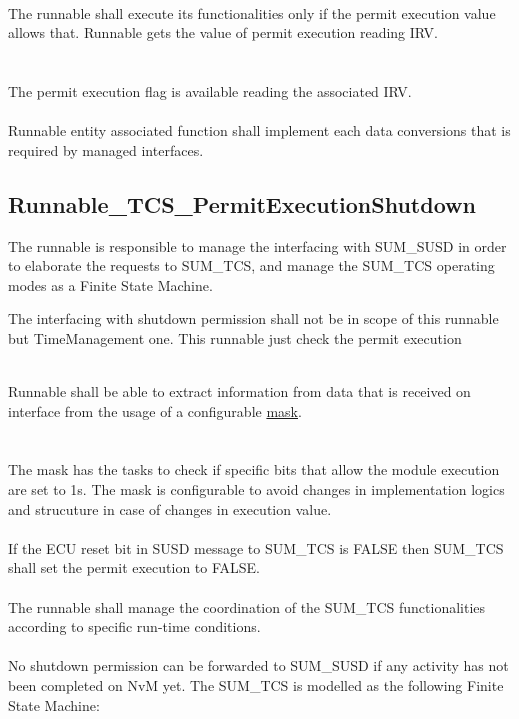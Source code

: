 \\
The runnable shall execute its functionalities only if the permit execution value allows that. Runnable gets the value of permit execution reading IRV.
\\
{}
\\
\\
The permit execution flag is available reading the associated IRV.
\\
\\
Runnable entity associated function shall implement each data conversions that is required by managed interfaces.

\subsection{Runnable_TCS_PermitExecutionShutdown}
\label{subsec:Runnable_TCS_PermitExecutionShutdown}

The runnable is responsible to manage the interfacing with SUM\_SUSD in order to elaborate the requests to SUM\_TCS, and manage the SUM\_TCS operating modes as a Finite State Machine.



The interfacing with shutdown permission shall not be in scope of this runnable but TimeManagement one. This runnable just check the permit execution

\\
Runnable shall be able to extract information from data that is received on interface  from the usage of a configurable \hyperref[conf:PermitExecutionMask]{mask}.
\\
{}
\\
\\
The mask has the tasks to check if specific bits that allow the module execution are set to 1s. The mask is configurable to avoid changes in implementation logics and strucuture in case of changes in
execution value.
\\
\\
If the ECU reset bit in SUSD message to SUM\_TCS is FALSE then SUM\_TCS shall set the permit execution to FALSE.
\\
{}
\\
The runnable shall manage the coordination of the SUM\_TCS functionalities according to specific run-time conditions. 
\\
\\
No shutdown permission can be forwarded to SUM\_SUSD if any activity has not been completed on NvM yet. The SUM\_TCS is modelled as the following Finite State Machine:
\\


